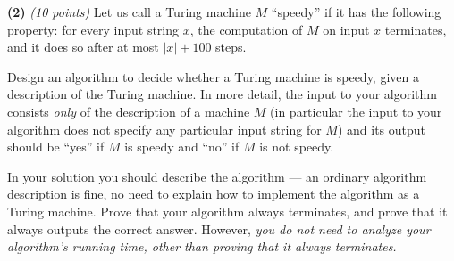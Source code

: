 \documentclass[11pt]{article}
\def\bigap{0.25in}
\begin{document}
\setlength{\parindent}{0in}
\addtolength{\parskip}{0.1cm}
\setlength{\fboxrule}{.5mm}\setlength{\fboxsep}{1.2mm}
\newlength{\boxlength}\setlength{\boxlength}{\textwidth}
\addtolength{\boxlength}{-4mm}
\begin{center}
\end{center}
\vspace{5mm}

{\bf (2)} {\em (10 points)}
Let us call a Turing machine $M$ ``speedy'' if it has the following
property: for every input string $x$, the computation of $M$ on 
input $x$ terminates, and it does so after at most $|x| + 100$ steps. 

Design an algorithm to decide whether a Turing machine is speedy,
given a description of the Turing machine. In more detail, the
input to your algorithm consists {\em only} of the description
of a machine $M$ (in particular the input to your algorithm does
not specify any particular input string for $M$) and its output
should be ``yes'' if $M$ is speedy and ``no'' if $M$ is not speedy.

In your solution you should describe the algorithm --- an ordinary
algorithm description is fine, no need to explain how to implement
the algorithm as a Turing machine. Prove that your algorithm
always terminates, and prove that it always outputs the correct
answer. However, {\em you do not need to analyze your algorithm's
running time, other than proving that it always terminates.}


\vskip \bigap

\end{document}
